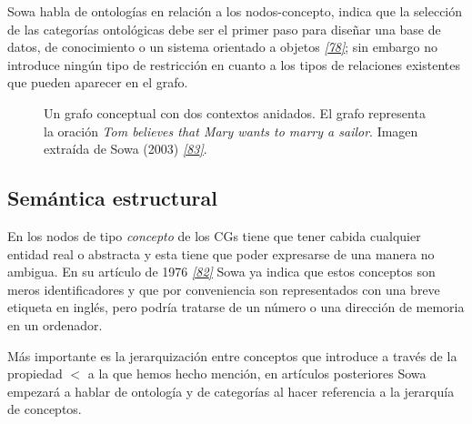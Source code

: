 \documentclass[a4paper,12pt,spanish]{book}
\begin{document}
Sowa habla de ontologías en relación a los nodos-concepto, indica que la selección de las
categorías ontológicas debe ser el primer paso para diseñar una base de datos, de
conocimiento o un sistema orientado a objetos \label{1.state-of-the-art/i.representacion-conocimiento:id17}{\hyperref[zreferences:shapiro2012]{\emph{{[}78{]}}}}; sin embargo no
introduce ningún tipo de restricción en cuanto a los tipos de relaciones existentes que
pueden aparecer en el grafo.
\begin{figure}[htbp]
\centering
\capstart

\caption[Ejemplo de grafo conceptual con contextos.]{Un grafo conceptual con dos contextos anidados. El grafo representa la oración \emph{Tom believes that Mary wants to marry a sailor}. Imagen extraída de Sowa (2003) \label{1.state-of-the-art/i.representacion-conocimiento:id18}{\hyperref[zreferences:sowa2003]{\emph{{[}83{]}}}}.}\label{1.state-of-the-art/i.representacion-conocimiento:fig-sowa}\end{figure}


\subsection{Semántica estructural}
\label{1.state-of-the-art/i.representacion-conocimiento:semantica-estructural}
En los nodos de tipo \emph{concepto} de los CGs tiene que tener cabida cualquier entidad real
o abstracta y esta tiene que poder expresarse de una manera no ambigua. En su artículo de
1976 \label{1.state-of-the-art/i.representacion-conocimiento:id19}{\hyperref[zreferences:sowa1976]{\emph{{[}82{]}}}} Sowa ya indica que estos conceptos son meros identificadores y que
por conveniencia son representados con una breve etiqueta en inglés, pero podría tratarse
de un número o una dirección de memoria en un ordenador.

Más importante es la jerarquización entre conceptos que introduce a través de la propiedad
\(<\) a la que hemos hecho mención, en artículos posteriores Sowa empezará a hablar de
ontología y de categorías al hacer referencia a la jerarquía de conceptos.
\end{document}
